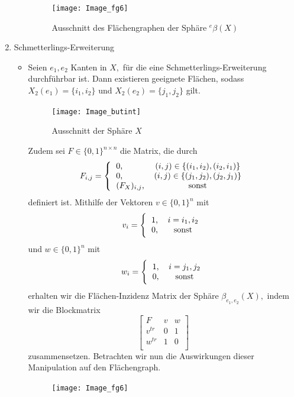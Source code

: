 \documentclass[12pt,titlepage,twoside,cleardoublepage]{article}
\theoremstyle{nummermitklammern}
\numberwithin{equation}{section}
\begin{document}
\begin{enumerate}
\begin{itemize}
\begin{figure}[H]
\begin{center}
\texttt{[image: Image\_fg6]}
\end{center}
\caption{Ausschnitt des Flächengraphen der Sphäre ${}^e\beta(X)$}
\end{figure}
\end{itemize}
\item Schmetterlings-Erweiterung
\begin{itemize}
\item Seien $e_1,e_2$ Kanten in $X,$ für die eine Schmetterlings-Erweiterung durchführbar ist. Dann existieren geeignete Flächen, sodass $X_2(e_1)=\{i_1,i_2\}$ und $X_2(e_2)=\{j_1,j_2\}$ gilt. 
\begin{figure}[H]
\begin{center}
\texttt{[image: Image\_butint]}
\end{center}
\caption{Ausschnitt der Sphäre $X$}
\end{figure}
Zudem sei $F\in \{0,1\}^{n\times n} $ die Matrix, die durch   
\[
F_{i,j}=
\Biggl{\{\begin{tabular}[l]{lcr}
0,&\textcolor{black}{$(i,j)\in \{(i_1,i_2),(i_2,i_1)\}$} \\
0,&\textcolor{black}{$(i,j)\in \{(j_1,j_2),(j_2,j_1)\}$} \\
$(F_{X})_{i,j}$,& sonst\\
\end{tabular}}
\]
definiert ist. Mithilfe der Vektoren $v\in \{0,1\}^n $ mit 
\[
v_{i}=
\Biggl{\{\begin{tabular}[l]{lcr}
1,& $i=i_1,i_2$\\
0,& sonst\\
\end{tabular}}
\]
und $w\in \{0,1\}^n $ mit 
\[
w_{i}=
\Biggl{\{\begin{tabular}[l]{lcr}
1,& $i=j_1,j_2$\\
0,& sonst\\ 
\end{tabular}}
\]
erhalten wir die Flächen-Inzidenz Matrix der Sphäre $\beta_{e_1,e_2}(X)
,$ indem wir die Blockmatrix 
\[
\left[ 
\begin{array}{c|cc} 
  F & v& w \\ 
  \hline 
  v^{tr}& 0 &1 \\
  w^{tr} &1 &0  \\
\end{array} 
\right]
\]
zusammensetzen. Betrachten wir nun die Auswirkungen dieser Manipulation auf den Flächengraph. 
\begin{figure}[H]
\begin{center}
\texttt{[image: Image\_fg6]}

\end{center}
\end{figure}
\end{itemize}
\end{enumerate}
\end{document}
